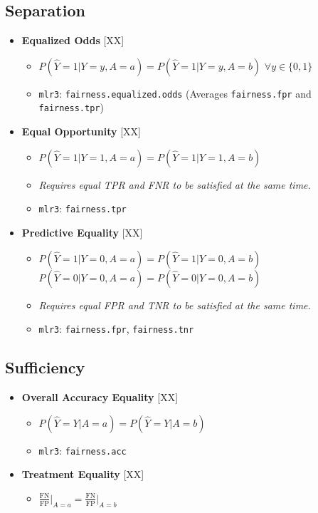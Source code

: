 \documentclass[12pt,a4paper]{article}
\begin{document}
\subsection*{Separation}
\begin{itemize}[leftmargin=2em]
    \item \textbf{Equalized Odds} \hfill [XX]
    \begin{itemize}
        \item $P(\hat{Y} = 1 | Y = y, A = a) = P(\hat{Y} = 1 | Y = y, A = b)$ \newline
        $\forall y \in \{0, 1\}$
        \item \texttt{mlr3}: \texttt{fairness.equalized.odds} \newline
        (Averages \texttt{fairness.fpr} and \texttt{fairness.tpr})
    \end{itemize}

    \item \textbf{Equal Opportunity} \hfill [XX]
    \begin{itemize}
        \item $P(\hat{Y} = 1 | Y = 1, A = a) = P(\hat{Y} = 1 | Y = 1, A = b)$
        \item \textit{Requires equal TPR and FNR to be satisfied at the same time.}
        \item \texttt{mlr3}: \texttt{fairness.tpr}
    \end{itemize}

    \item \textbf{Predictive Equality} \hfill [XX]
    \begin{itemize}
        \item $P(\hat{Y} = 1 | Y = 0, A = a) = P(\hat{Y} = 1 | Y = 0, A = b)$ \newline
        $P(\hat{Y} = 0 | Y = 0, A = a) = P(\hat{Y} = 0 | Y = 0, A = b)$
        \item \textit{Requires equal FPR and TNR to be satisfied at the same time.}
        \item \texttt{mlr3}: \texttt{fairness.fpr}, \texttt{fairness.tnr}
    \end{itemize}
\end{itemize}

\subsection*{Sufficiency}
\begin{itemize}[leftmargin=2em]
    \item \textbf{Overall Accuracy Equality} \hfill [XX]
    \begin{itemize}
        \item $P(\hat{Y} = Y | A = a) = P(\hat{Y} = Y | A = b)$
        \item \texttt{mlr3}: \texttt{fairness.acc}
    \end{itemize}

    \item \textbf{Treatment Equality} \hfill [XX]
    \begin{itemize}
        \item $\frac{\text{FN}}{\text{FP}} \big|_{A = a} = \frac{\text{FN}}{\text{FP}} \big|_{A = b}$
    \end{itemize}
\end{itemize}
\end{document}
